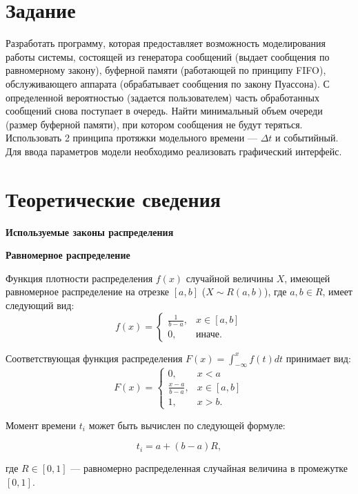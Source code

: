 \section*{Задание}

Разработать программу, которая предоставляет возможность моделирования работы системы, состоящей из генератора сообщений (выдает сообщения по равномерному закону), буферной памяти (работающей по принципу FIFO), обслуживающего аппарата (обрабатывает сообщения по закону Пуассона). С определенной вероятностью (задается пользователем) часть обработанных сообщений снова поступает в очередь. Найти минимальный объем очереди (размер буферной памяти), при котором сообщения не будут теряться.
Использовать 2 принципа протяжки модельного времени --- $\Delta{t}$ и событийный. Для ввода параметров модели необходимо реализовать графический интерфейс.

\section*{Теоретические сведения}
\textbf{Используемые законы распределения}

\textbf{Равномерное распределение}

Функция плотности распределения $f(x)$ случайной величины $X$, имеющей равномерное распределение на отрезке $[a, b]$ ($X \sim R(a, b)$), где $a, b \in R$, имеет следующий вид:
\begin{equation}
	f(x)=\begin{cases}
		\frac{1}{b - a}, & x \in [a, b] \\
		0, & \text{иначе}.
	\end{cases}
\end{equation}

Соответствующая функция распределения $F(x) = \int_{-\infty}^{x}f(t)dt$ принимает вид: 
\begin{equation}
	F(x)=\begin{cases}
		0, & x < a \\
		\frac{x - a}{b - a}, & x \in [a, b] \\
		1, & x > b.
	\end{cases}
\end{equation}

Момент времени $t_i$ может быть вычислен по следующей формуле:

\begin{equation}
    t_i = a + (b - a) R, 
\end{equation}

где $R \in [0, 1]$ --- равномерно распределенная случайная величина в
промежутке~$[0, 1]$.

